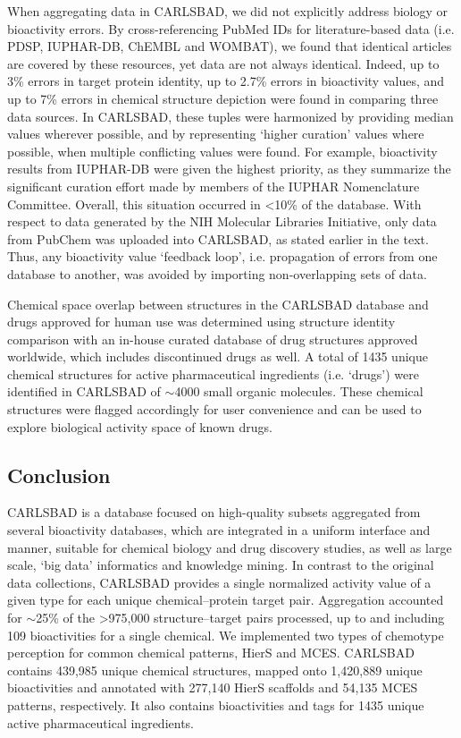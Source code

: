 When aggregating data in CARLSBAD, we did not explicitly address biology or bioactivity errors. By cross-referencing PubMed IDs for literature-based data (i.e. PDSP, IUPHAR-DB, ChEMBL and WOMBAT), we found that identical articles are covered by these resources, yet data are not always identical. Indeed, up to 3\% errors in target protein identity, up to 2.7\% errors in bioactivity values, and up to 7\% errors in chemical structure depiction were found in comparing three data sources. In CARLSBAD, these tuples were harmonized by providing median values wherever possible, and by representing ‘higher curation’ values where possible, when multiple conflicting values were found. For example, bioactivity results from IUPHAR-DB were given the highest priority, as they summarize the significant curation effort made by members of the IUPHAR Nomenclature Committee. Overall, this situation occurred in \textless 10\% of the database. With respect to data generated by the NIH Molecular Libraries Initiative\cite{Austin2004-qc}, only data from PubChem was uploaded into CARLSBAD, as stated earlier in the text. Thus, any bioactivity value ‘feedback loop’, i.e. propagation of errors from one database to another, was avoided by importing non-overlapping sets of data.

Chemical space overlap between structures in the CARLSBAD database and drugs approved for human use was determined using structure identity comparison with an in-house curated database of drug structures approved worldwide, which includes discontinued drugs as well\cite{Oprea2010-kd,Manallack2013-qm}. A total of 1435 unique chemical structures for active pharmaceutical ingredients (i.e. ‘drugs’) were identified in CARLSBAD of $\sim$4000 small organic molecules. These chemical structures were flagged accordingly for user convenience and can be used to explore biological activity space of known drugs.

\subsection{Conclusion}

CARLSBAD is a database focused on high-quality subsets aggregated from several bioactivity databases, which are integrated in a uniform interface and manner, suitable for chemical biology and drug discovery studies, as well as large scale, ‘big data’ informatics and knowledge mining. In contrast to the original data collections, CARLSBAD provides a single normalized activity value of a given type for each unique chemical–protein target pair. Aggregation accounted for $\sim$25\% of the \textgreater 975,000 structure–target pairs processed, up to and including 109 bioactivities for a single chemical. We implemented two types of chemotype perception for common chemical patterns, HierS and MCES. CARLSBAD contains 439,985 unique chemical structures, mapped onto 1,420,889 unique bioactivities and annotated with 277,140 HierS scaffolds and 54,135 MCES patterns, respectively. It also contains bioactivities and tags for 1435 unique active pharmaceutical ingredients.

